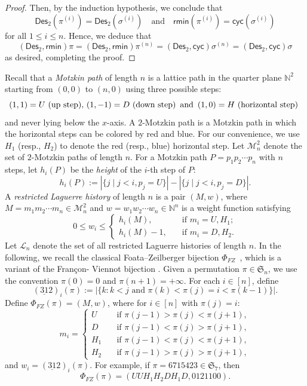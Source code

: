\documentclass[12pt]{article}
\numberwithin{equation}{section}
\theoremstyle{plain}
\def\cyc{\mathsf{cyc}}
\def\Des{\mathsf{Des}}
\def\rmin{\mathsf{rmin}}
\begin{document}
\begin{proof}
     Then, by the induction hypothesis, we conclude that
     \[
     \Des_2(\pi^{(i)})=\Des_2(\sigma^{(i)})\quad \mbox{and}\quad \rmin(\pi^{(i)})=\cyc(\sigma^{(i)})
     \]
     for all $1\leq i\leq n$. Hence, we deduce that
     \[
     (\Des_2, \rmin)\pi=  (\Des_2, \rmin)\pi^{(n)}= (\Des_2, \cyc)\sigma^{(n)}=(\Des_2, \cyc)\sigma
     \]
     as desired, completing the proof. 
     	\end{proof}
      
      
      Recall that a  {\em  Motzkin path} of length $n$  is a lattice path in the quarter plane $\mathbb{N}^2$ starting from  $(0,0)$ to $(n,0)$   using three  possible steps:
      $$
      \text{$(1,1)=U$ (up step), $(1,-1)=D$ (down step)\,\,\,and\,\,\,$(1,0)=H$ (horizontal step)  } 
      $$
      and never lying below the $x$-axis. 
      A $2$-Motzkin path is a Motzkin path in which the horizontal steps can be colored by red and  blue. For our convenience, we use $H_1$ (resp., $H_2$) to denote the red (resp., blue) horizontal step.  Let $\mathcal{M}^2_n$  denote the set of  $2$-Motzkin paths of length $n$. 
      For a   Motzkin path $P=p_1p_2\cdots p_n$ with $n$ steps, let $h_i(P)$ be the {\em height} of the $i$-th step of $P$:
      $$
      h_i(P):=|\{j\mid j<i, p_j=U\}|-|\{j\mid j<i, p_j=D\}|.
      $$
      A {\em restricted Laguerre history} of length $n$ is a pair $(M,w)$, where $M=m_1m_2\cdots m_n\in\mathcal{M}^2_n$ and $w=w_1w_2\cdots w_n\in \mathbb{N}^n$ is a weight function satisfying
      $$
      0\leq w_i\leq \begin{cases}
      	h_i(M),\quad&\text{if $m_i=U, H_1$};\\
      	h_i(M)-1, \quad&\text{if $m_i=D, H_2$}.
      \end{cases}
      $$
      Let $\mathcal{L}_n$ denote the set of all restricted Laguerre histories of length $n$. In the following, we   recall
      the classical Foata--Zeilberger bijection $\Phi_{FZ}$~\cite{FZ}, which is a variant of the Fran\c con- Viennot bijection \cite{francon1979permutations}. 
      Given a permutation $\pi\in \mathfrak{S}_n$, we use the convention
      $\pi(0)=0$ and $\pi(n+1)=+\infty$. For each $i\in[n]$,  define 
      $$(\underline{31}2)_i(\pi):=|\{k: k<j\text{ and } \pi(k)<\pi(j)=i<\pi(k-1)\}|.$$
      Define $\Phi_{FZ}(\pi)=(M,w)$, where for  $i\in[n]$ with $\pi(j)=i$:
      $$
      m_i=\left\{
      \begin{array}{ll}
      	U&\quad\mbox{if $\pi(j-1)>\pi(j)<\pi(j+1)$},  \\
      	D&\quad\mbox{if $\pi(j-1)<\pi(j)>\pi(j+1)$},  \\
      	H_1&\quad\mbox{if $\pi(j-1)<\pi(j)<\pi(j+1)$},\\
      	H_2&\quad\mbox{if $\pi(j-1)>\pi(j)>\pi(j+1)$},
      \end{array}
      \right.
      $$
      and $w_i=(\underline{31}2)_i(\pi)$.
       For example,  if $\pi=6715423\in\mathfrak{S}_7$, then
       $$\Phi_{FZ}(\pi)=(UUH_1H_2DH_1D,  0121100).$$
      
\end{document}
